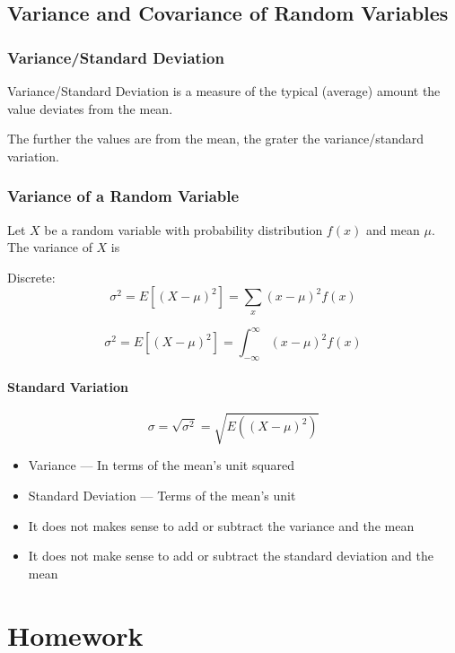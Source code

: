 \documentclass{book}
\begin{document}
\section{Variance and Covariance of Random Variables}

\subsection{Variance/Standard Deviation}

Variance/Standard Deviation is a measure of the typical (average) amount the value deviates from the mean.

The further the values are from the mean, the grater the variance/standard variation. 

\subsection{Variance of a Random Variable}
Let $X$ be a random variable with probability distribution $f(x)$ and mean $\mu$. The variance of $X$ is 

Discrete:
$$\sigma^2=E[(X-\mu)^2]=\sum_x(x-\mu)^2 f(x)$$

$$\sigma^2=E[(X-\mu)^2]=\int_{-\infty}^\infty (x-\mu)^2 f(x)$$

\subsubsection{Standard Variation}

$$\sigma = \sqrt{\sigma^2} = \sqrt{E((X-\mu)^2)}$$

\begin{itemize}
\item Variance --- In terms of the mean's unit squared
\item Standard Deviation --- Terms of the mean's unit
\item It does not makes sense to add or subtract the variance and the mean
\item It does not make sense to add or subtract the standard deviation and the mean
\end{itemize}






\appendix
\chapter{Homework}
\end{document}
